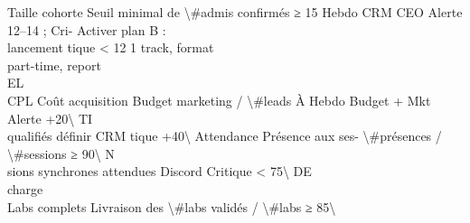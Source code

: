 \documentclass[12pt,landscape,a4paper]{article}
\begin{document}
Taille cohorte Seuil minimal de \textbackslash{}#admis confirmés               ≥ 15    Hebdo     CRM        CEO       Alerte 12–14 ; Cri-   Activer plan B :\\
lancement                                                                              tique \textless{} 12            1 track, format\\
part-time, report\\
\vspace{0.5em}
\vspace{0.5em}
\vspace{0.5em}
\vspace{0.5em}
EL\\
CPL            Coût acquisition  Budget marketing / \textbackslash{}#leads À       Hebdo         Budget + Mkt         Alerte +20\textbackslash{}%
\vspace{0.5em}
\vspace{0.5em}
\vspace{0.5em}
\vspace{0.5em}
TI\\
qualifiés                 définir               CRM                  tique +40\textbackslash{}%
Attendance     Présence aux ses- \textbackslash{}#présences / \textbackslash{}#sessions    ≥ 90\textbackslash{}%
\vspace{0.5em}
\vspace{0.5em}
\vspace{0.5em}
\vspace{0.5em}
N\\
sions synchrones attendues                                        Discord              Critique \textless{} 75\textbackslash{}%
\vspace{0.5em}
\vspace{0.5em}
\vspace{0.5em}
\vspace{0.5em}
DE\\
charge\\
Labs complets Livraison des       \textbackslash{}#labs validés / \textbackslash{}#labs        ≥ 85\textbackslash{}%
\end{document}
